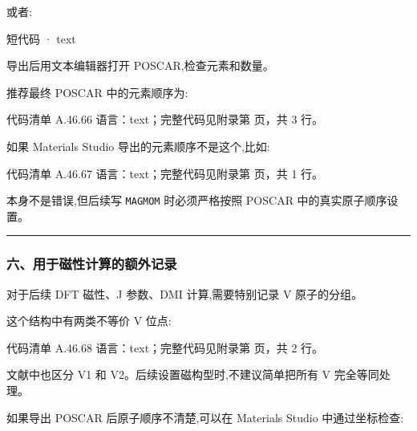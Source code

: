\documentclass[lang=cn,scheme=chinese,color=blue,device=normal,toc=onecol,math=cm]{elegantbook}
\begin{document}
或者:\par


\begin{inlinecodebox}{短代码 · text}
\end{inlinecodebox}


导出后用文本编辑器打开 POSCAR,检查元素和数量。\par


推荐最终 POSCAR 中的元素顺序为:\par


\begin{codeindexbox}{代码清单 A.46.66}
语言：text；完整代码见附录第 \pageref{code:46:66} 页，共 3 行。
\end{codeindexbox}


如果 Materials Studio 导出的元素顺序不是这个,比如:\par


\begin{codeindexbox}{代码清单 A.46.67}
语言：text；完整代码见附录第 \pageref{code:46:67} 页，共 1 行。
\end{codeindexbox}


本身不是错误,但后续写 \texttt{MAGMOM} 时必须严格按照 POSCAR 中的真实原子顺序设置。\par


\medskip\hrule\medskip


\subsubsection{六、用于磁性计算的额外记录}


对于后续 DFT 磁性、J 参数、DMI 计算,需要特别记录 V 原子的分组。\par


这个结构中有两类不等价 V 位点:\par


\begin{codeindexbox}{代码清单 A.46.68}
语言：text；完整代码见附录第 \pageref{code:46:68} 页，共 2 行。
\end{codeindexbox}


文献中也区分 V1 和 V2。后续设置磁构型时,不建议简单把所有 V 完全等同处理。\par


如果导出 POSCAR 后原子顺序不清楚,可以在 Materials Studio 中通过坐标检查:\par
\end{document}
